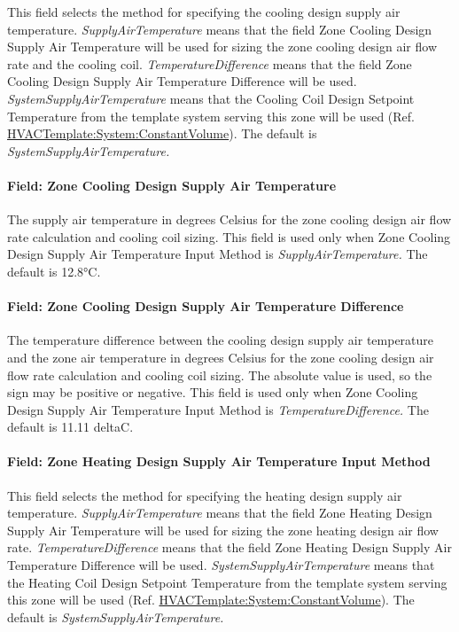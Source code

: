 This field selects the method for specifying the cooling design supply air temperature. \emph{SupplyAirTemperature} means that the field Zone Cooling Design Supply Air Temperature will be used for sizing the zone cooling design air flow rate and the cooling coil. \emph{TemperatureDifference} means that the field Zone Cooling Design Supply Air Temperature Difference will be used. \emph{SystemSupplyAirTemperature} means that the Cooling Coil Design Setpoint Temperature from the template system serving this zone will be used (Ref. \hyperref[hvactemplatesystemconstantvolume]{HVACTemplate:System:ConstantVolume}). The default is \emph{SystemSupplyAirTemperature.}

\paragraph{Field: Zone Cooling Design Supply Air Temperature}\label{field-zone-cooling-design-supply-air-temperature-8}

The supply air temperature in degrees Celsius for the zone cooling design air flow rate calculation and cooling coil sizing. This field is used only when Zone Cooling Design Supply Air Temperature Input Method is \emph{SupplyAirTemperature.} The default is 12.8°C.

\paragraph{Field: Zone Cooling Design Supply Air Temperature Difference}\label{field-zone-cooling-design-supply-air-temperature-difference-9}

The temperature difference between the cooling design supply air temperature and the zone air temperature in degrees Celsius for the zone cooling design air flow rate calculation and cooling coil sizing. The absolute value is used, so the sign may be positive or negative. This field is used only when Zone Cooling Design Supply Air Temperature Input Method is \emph{TemperatureDifference.} The default is 11.11 deltaC.

\paragraph{Field: Zone Heating Design Supply Air Temperature Input Method}\label{field-zone-heating-design-supply-air-temperature-input-method-9}

This field selects the method for specifying the heating design supply air temperature. \emph{SupplyAirTemperature} means that the field Zone Heating Design Supply Air Temperature will be used for sizing the zone heating design air flow rate. \emph{TemperatureDifference} means that the field Zone Heating Design Supply Air Temperature Difference will be used. \emph{SystemSupplyAirTemperature} means that the Heating Coil Design Setpoint Temperature from the template system serving this zone will be used (Ref. \hyperref[hvactemplatesystemconstantvolume]{HVACTemplate:System:ConstantVolume}). The default is \emph{SystemSupplyAirTemperature.}

